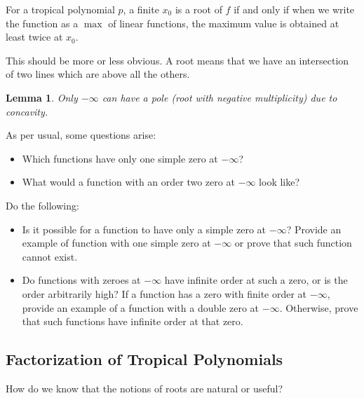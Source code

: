 \documentclass[12pt]{memoir}
\newtheorem{protolemma}[prototheorem]{Lemma}
\newenvironment{lemma}
   {\begin{protolemma}}
   {\end{protolemma}}
\theoremstyle{definition}
\begin{document}
\begin{Lem}
For a tropical polynomial $p$, a finite $x_0$ is a root of $f$ if and only if when we write the function as a $\max$ of linear functions, the maximum value is obtained at least twice at $x_0$.\par 

\end{Lem}

This should be more or less obvious. A root means that we have an intersection of two lines which are above all the others.


\begin{lemma}
    Only $-\infty$ can have a pole (root with negative multiplicity) due to concavity.
\end{lemma}

As per usual, some questions arise:
\begin{significant}
    \begin{itemize}
        \item Which functions have only one simple zero at $-\infty$?
        \item What would a function with an order two zero at $-\infty$ look like?
    \end{itemize} 
\end{significant}

\begin{Ej}
    Do the following:
    \begin{itemize}
        \item Is it possible for a function to have only a simple zero at $-\infty$? Provide an example of function with one simple zero at $-\infty$ or prove that such function cannot exist. 
        \item Do functions with zeroes at $-\infty$ have infinite order at such a zero, or is the order arbitrarily high? If a function has a zero with finite order at $-\infty$, provide an example of a function with a double zero at $-\infty$. Otherwise, prove that such functions have infinite order at that zero.
    \end{itemize}
\end{Ej}

\subsection{Factorization of Tropical Polynomials}

How do we know that the notions of roots are natural or useful?
\end{document}
